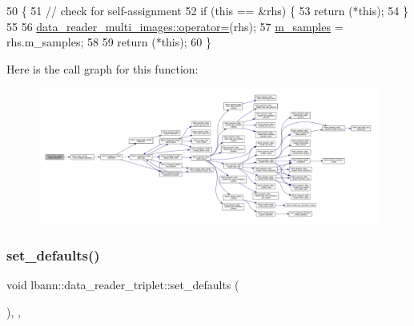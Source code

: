 \begin{DoxyCode}
50                                                                                   \{
51   \textcolor{comment}{// check for self-assignment}
52   \textcolor{keywordflow}{if} (\textcolor{keyword}{this} == &rhs) \{
53     \textcolor{keywordflow}{return} (*\textcolor{keyword}{this});
54   \}
55 
56   \hyperlink{classlbann_1_1data__reader__multi__images_a8d9eae4dde10654c1f1bf7c1fe685e99}{data\_reader\_multi\_images::operator=}(rhs);
57   \hyperlink{classlbann_1_1data__reader__triplet_a1f414c6d80f6e48fc91f98db0531f1f8}{m\_samples} = rhs.m\_samples;
58 
59   \textcolor{keywordflow}{return} (*\textcolor{keyword}{this});
60 \}
\end{DoxyCode}
Here is the call graph for this function\+:\nopagebreak
\begin{figure}[H]
\begin{center}
\leavevmode
\includegraphics[width=350pt]{classlbann_1_1data__reader__triplet_a096c73a8b3d163faadfee3b9d14fc842_cgraph}
\end{center}
\end{figure}
\mbox{\label{classlbann_1_1data__reader__triplet_a88bc385a2d42e9f78a768ff496036843}} 
\subsubsection{\texorpdfstring{set\+\_\+defaults()}{set\_defaults()}}
{\footnotesize\ttfamily void lbann\+::data\+\_\+reader\+\_\+triplet\+::set\+\_\+defaults (\begin{DoxyParamCaption}{ }\end{DoxyParamCaption})\hspace{0.3cm}{\ttfamily [override]}, {\ttfamily [protected]}, {\ttfamily [virtual]}}



